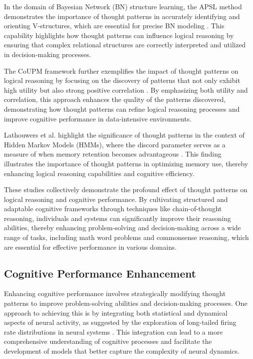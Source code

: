 In the domain of Bayesian Network (BN) structure learning, the APSL method demonstrates the importance of thought patterns in accurately identifying and orienting V-structures, which are essential for precise BN modeling \cite{ling2021bayesiannetworkstructurelearning}. This capability highlights how thought patterns can influence logical reasoning by ensuring that complex relational structures are correctly interpreted and utilized in decision-making processes.



The CoUPM framework further exemplifies the impact of thought patterns on logical reasoning by focusing on the discovery of patterns that not only exhibit high utility but also strong positive correlation \cite{gan2019correlatedutilitybasedpatternmining}. By emphasizing both utility and correlation, this approach enhances the quality of the patterns discovered, demonstrating how thought patterns can refine logical reasoning processes and improve cognitive performance in data-intensive environments.



Lathouwers et al. highlight the significance of thought patterns in the context of Hidden Markov Models (HMMs), where the discord parameter serves as a measure of when memory retention becomes advantageous \cite{lathouwers2017memorypaysdiscordhidden}. This finding illustrates the importance of thought patterns in optimizing memory use, thereby enhancing logical reasoning capabilities and cognitive efficiency.



These studies collectively demonstrate the profound effect of thought patterns on logical reasoning and cognitive performance. By cultivating structured and adaptable cognitive frameworks through techniques like chain-of-thought reasoning, individuals and systems can significantly improve their reasoning abilities, thereby enhancing problem-solving and decision-making across a wide range of tasks, including math word problems and commonsense reasoning, which are essential for effective performance in various domains. \cite{wei2022chain}



\subsection{Cognitive Performance Enhancement} \label{subsec:Cognitive Performance Enhancement}

Enhancing cognitive performance involves strategically modifying thought patterns to improve problem-solving abilities and decision-making processes. One approach to achieving this is by integrating both statistical and dynamical aspects of neural activity, as suggested by the exploration of long-tailed firing rate distributions in neural systems \cite{sorbaro2018statisticalmodelsneuralactivity}. This integration can lead to a more comprehensive understanding of cognitive processes and facilitate the development of models that better capture the complexity of neural dynamics.



